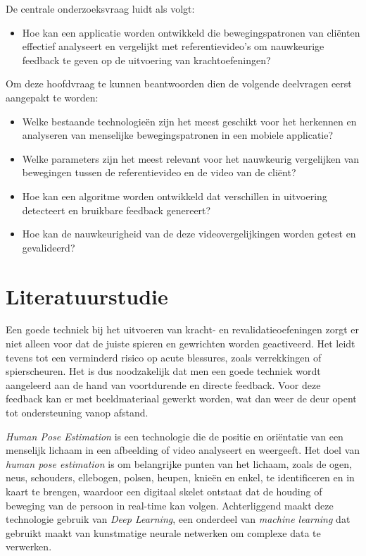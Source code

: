 De centrale onderzoeksvraag luidt als volgt:

\begin{itemize}
  \item Hoe kan een applicatie worden ontwikkeld die bewegingspatronen van cliënten effectief analyseert en vergelijkt met referentievideo’s om nauwkeurige feedback te geven op de uitvoering van krachtoefeningen?
\end{itemize}

Om deze hoofdvraag te kunnen beantwoorden dien de volgende deelvragen eerst aangepakt te worden:

\begin{itemize}
  \item Welke bestaande technologieën zijn het meest geschikt voor het herkennen en analyseren van menselijke bewegingspatronen in een mobiele applicatie?
  \item Welke parameters zijn het meest relevant voor het nauwkeurig vergelijken van bewegingen tussen de referentievideo en de video van de cliënt?
  \item Hoe kan een algoritme worden ontwikkeld dat verschillen in uitvoering detecteert en bruikbare feedback genereert?
  \item Hoe kan de nauwkeurigheid van de deze videovergelijkingen worden getest en gevalideerd?
\end{itemize}


\section{Literatuurstudie}%
\label{sec:literatuurstudie}


Een goede techniek bij het uitvoeren van kracht- en revalidatieoefeningen zorgt er niet alleen voor dat de juiste spieren en gewrichten worden geactiveerd. Het leidt tevens tot een verminderd risico op acute blessures, zoals verrekkingen of spierscheuren. Het is dus noodzakelijk dat men een goede techniek wordt aangeleerd aan de hand van voortdurende en directe feedback. Voor deze feedback kan er met beeldmateriaal gewerkt worden, wat dan weer de deur opent tot ondersteuning vanop afstand\autocite{MyerEtAl2009}.

\emph{Human Pose Estimation} is een technologie die de positie en oriëntatie van een menselijk lichaam in een afbeelding of video analyseert en weergeeft. Het doel van \emph{human pose estimation} is om belangrijke punten van het lichaam, zoals de ogen, neus, schouders, ellebogen, polsen, heupen, knieën en enkel, te identificeren en in kaart te brengen, waardoor een digitaal skelet ontstaat dat de houding of beweging van de persoon in real-time kan volgen. Achterliggend maakt deze technologie gebruik van \emph{Deep Learning}, een onderdeel van \emph{machine learning} dat gebruikt maakt van kunstmatige neurale netwerken om complexe data te verwerken\autocite{JosyulaEtAl2021}.

